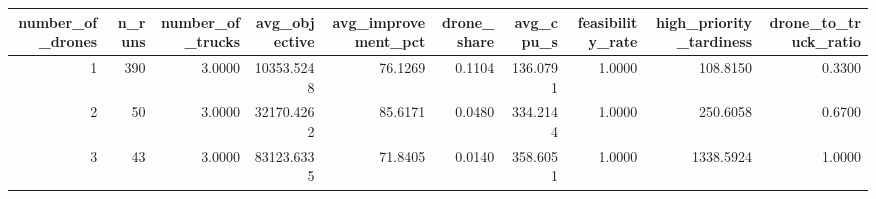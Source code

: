\begin{tabular}{rrrrrrrrrr}
\toprule
number_of_drones & n_runs & number_of_trucks & avg_objective & avg_improvement_pct & drone_share & avg_cpu_s & feasibility_rate & high_priority_tardiness & drone_to_truck_ratio \\
\midrule
1 & 390 & 3.0000 & 10353.5248 & 76.1269 & 0.1104 & 136.0791 & 1.0000 & 108.8150 & 0.3300 \\
2 & 50 & 3.0000 & 32170.4262 & 85.6171 & 0.0480 & 334.2144 & 1.0000 & 250.6058 & 0.6700 \\
3 & 43 & 3.0000 & 83123.6335 & 71.8405 & 0.0140 & 358.6051 & 1.0000 & 1338.5924 & 1.0000 \\
\bottomrule
\end{tabular}
